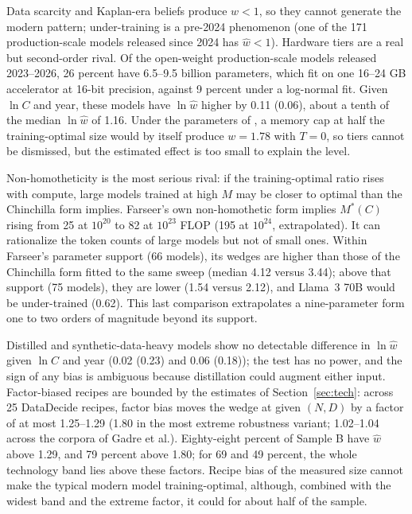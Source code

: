 Data scarcity and Kaplan-era beliefs produce $w<1$, so they cannot generate the modern pattern; under-training is a
pre-2024 phenomenon (one of the 171 production-scale models released since 2024 has $\hat w<1$). Hardware tiers are a
real but second-order rival. Of the open-weight production-scale models released 2023--2026, 26 percent have 6.5--9.5
billion parameters, which fit on one 16--24 GB accelerator at 16-bit precision, against 9 percent under a log-normal fit.
Given $\ln C$ and year, these models have $\ln\hat w$ higher by 0.11 (0.06), about a tenth of the median $\ln\hat w$ of
1.16. Under the parameters of \citet{besiroglu2024chinchilla}, a memory cap at half the training-optimal size would by
itself produce $w=1.78$ with $T=0$, so tiers cannot be dismissed, but the estimated effect is too small to explain the
level.

Non-homotheticity is the most serious rival: if the training-optimal ratio rises with compute, large models trained at
high $M$ may be closer to optimal than the Chinchilla form implies. Farseer's own non-homothetic form
\citep[Eq.~3]{li2025predictableb} implies $M^*(C)$ rising from 25 at $10^{20}$ to 82 at $10^{23}$ FLOP (195 at $10^{24}$,
extrapolated). It can rationalize the token counts of large models but not of small ones. Within Farseer's parameter
support (66 models), its wedges are higher than those of the Chinchilla form fitted to the same sweep (median 4.12 versus
3.44); above that support (75 models), they are lower (1.54 versus 2.12), and Llama~3 70B would be under-trained (0.62).
This last comparison extrapolates a nine-parameter form one to two orders of magnitude beyond its support.

Distilled and synthetic-data-heavy models show no detectable difference in $\ln\hat w$ given $\ln C$ and year (0.02
(0.23) and 0.06 (0.18)); the test has no power, and the sign of any bias is ambiguous because distillation could augment
either input. Factor-biased recipes are bounded by the estimates of Section~\ref{sec:tech}: across 25 DataDecide recipes,
factor bias moves the wedge at given $(N,D)$ by a factor of at most 1.25--1.29 (1.80 in the most extreme robustness
variant; 1.02--1.04 across the corpora of Gadre et al.). Eighty-eight percent of Sample B have $\hat w$ above 1.29, and 79
percent above 1.80; for 69 and 49 percent, the whole technology band lies above these factors. Recipe bias of the
measured size cannot make the typical modern model training-optimal, although, combined with the widest band and the
extreme factor, it could for about half of the sample.

